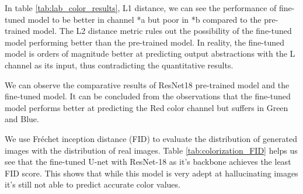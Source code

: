 \documentclass{article} %
\begin{document}
In table \ref{tab:lab_color_results}, L1 distance, we can see the performance of fine-tuned model to be better in channel *a but poor in *b compared to the pre-trained model. The L2 distance metric rules out the possibility of the fine-tuned model performing better than the pre-trained model. In reality, the fine-tuned model is orders of magnitude better at predicting output abstractions with the L channel as its input, thus contradicting the quantitative results.
    
    We can observe the comparative results of ResNet18 pre-trained model and the fine-tuned model. It can be concluded from the observations that the fine-tuned model performs better at predicting the Red color channel but suffers in Green and Blue.
    
    We use Fréchet inception distance (FID) to evaluate the distribution of generated images with the distribution of real images. Table \ref{tab:colorization_FID} helps us see that the fine-tuned U-net with ResNet-18 as it's backbone achieves the least FID score. This shows that while this model is very adept at hallucinating images it's still not able to predict accurate color values. 
\end{document}
